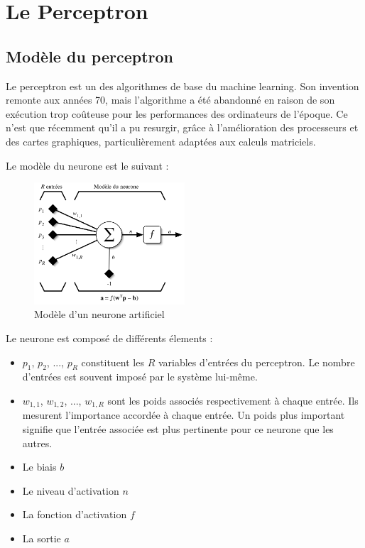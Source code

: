 \section{Le Perceptron}
\fancyhead[R]{\textit{\nouppercase{\leftmark}}}

\subsection{Modèle du perceptron}

Le perceptron est un des algorithmes de base du machine learning. Son invention remonte aux années 70, mais l'algorithme a été abandonné en 
raison de son exécution trop coûteuse pour les performances des ordinateurs de l’époque. Ce n’est que récemment qu’il a pu resurgir, grâce 
à l’amélioration des processeurs et des cartes graphiques, particulièrement adaptées aux calculs matriciels.

Le modèle du neurone est le suivant : 

\begin{figure}[h]
 \centering
 \includegraphics[width=0.5\textwidth]{img/neurone.png}
 \caption{Modèle d'un neurone artificiel}
\end{figure}

Le neurone est composé de différents élements : 
\begin{itemize}
 \item $p_1$, $p_2$, ..., $p_R$ constituent les $R$ variables d'entrées du perceptron. Le nombre d'entrées est souvent imposé par le système lui-même.
 \item $w_{1,1}$, $w_{1,2}$, ..., $w_{1,R}$ sont les poids associés respectivement à chaque entrée. Ils mesurent l'importance accordée à chaque entrée. Un poids
 plus important signifie que l'entrée associée est plus pertinente pour ce neurone que les autres.
 \item Le biais $b$
 \item Le niveau d'activation $n$
 \item La fonction d'activation $f$
 \item La sortie $a$
\end{itemize}

